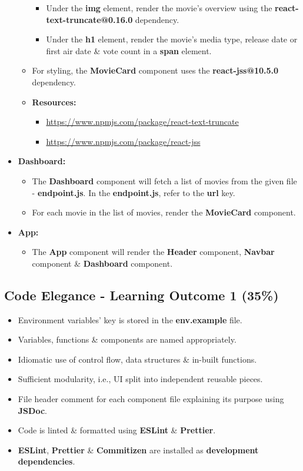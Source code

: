 \documentclass{article}
\begin{document}
\begin{itemize}
\begin{itemize}
		\begin{itemize}
			\item Under the \textbf{img} element, render the movie's overview using the \textbf{react-text-truncate@0.16.0} dependency. 
			\item Under the \textbf{h1} element, render the movie's media type, release date or first air date \& vote count in a \textbf{span} element. 
		\end{itemize}
		\item For styling, the \textbf{MovieCard} component uses the \textbf{react-jss@10.5.0} dependency.
		\item \textbf{Resources:}
		\begin{itemize}
			\item \href{https://www.npmjs.com/package/react-text-truncate}{https://www.npmjs.com/package/react-text-truncate}
			\item \href{https://www.npmjs.com/package/react-jss}{https://www.npmjs.com/package/react-jss}
		\end{itemize}
	\end{itemize}
	\item \textbf{Dashboard:}
	\begin{itemize}
		\item The \textbf{Dashboard} component will fetch a list of movies from the given file - \textbf{endpoint.js}. In the \textbf{endpoint.js}, refer to the \textbf{url} key.
		\item For each movie in the list of movies, render the \textbf{MovieCard} component.
	\end{itemize}
	\item \textbf{App:}
	\begin{itemize}
		\item The \textbf{App} component will render the \textbf{Header} component, \textbf{Navbar} component \& \textbf{Dashboard} component.
	\end{itemize}
\end{itemize}

\subsection*{Code Elegance - Learning Outcome 1 (35\%)}
\begin{itemize}
	\item Environment variables' key is stored in the \textbf{env.example} file. 
	\item Variables, functions \& components are named appropriately.
	\item Idiomatic use of control flow, data structures \& in-built functions.
	\item Sufficient modularity, i.e., UI split into independent reusable pieces.
	\item File header comment for each component file explaining its purpose using \textbf{JSDoc}.
	\item Code is linted \& formatted using \textbf{ESLint} \& \textbf{Prettier}.
	\item \textbf{ESLint}, \textbf{Prettier} \& \textbf{Commitizen} are installed as \textbf{development dependencies}.	
\end{itemize}
\end{document}
